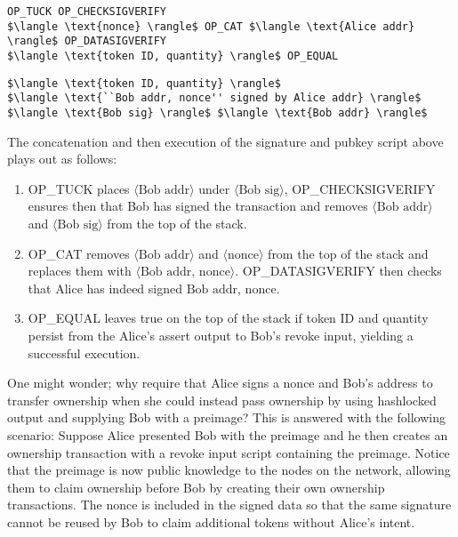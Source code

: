 \documentclass[9pt,oneside]{amsart}
\begin{document}
\begin{lstlisting}[title={\textbf{Alice's Assert PubKey Script}}]
OP_TUCK OP_CHECKSIGVERIFY
$\langle \text{nonce} \rangle$ OP_CAT $\langle \text{Alice addr} \rangle$ OP_DATASIGVERIFY
$\langle \text{token ID, quantity} \rangle$ OP_EQUAL
\end{lstlisting}

\begin{lstlisting}[title={\textbf{Bob's Revoke Signature Script}}]
$\langle \text{token ID, quantity} \rangle$ 
$\langle \text{``Bob addr, nonce'' signed by Alice addr} \rangle$ $\langle \text{Bob sig} \rangle$ $\langle \text{Bob addr} \rangle$ 
\end{lstlisting}

The concatenation and then execution of the signature and pubkey script above plays out as follows:
\begin{enumerate}
    \item OP\_TUCK places $\langle \text{Bob addr} \rangle$ under $\langle \text{Bob sig} \rangle$, OP\_CHECKSIGVERIFY ensures then that Bob has signed the transaction and removes $\langle \text{Bob addr} \rangle$ and $\langle \text{Bob sig} \rangle$ from the top of the stack.
    \item OP\_CAT removes $\langle \text{Bob addr} \rangle$ and $\langle \text{nonce} \rangle$ from the top of the stack and replaces them with $\langle \text{Bob addr, nonce} \rangle$. OP\_DATASIGVERIFY then checks that Alice has indeed signed $\text{Bob addr, nonce}$.
    \item OP\_EQUAL leaves true on the top of the stack if token ID and quantity persist from the Alice's assert output to Bob's revoke input, yielding a successful execution.
\end{enumerate}


One might wonder; why require that Alice signs a nonce and Bob's address to transfer ownership when she could instead pass ownership by using hashlocked output and supplying Bob with a preimage? This is answered with the following scenario: Suppose Alice presented Bob with the preimage and he then creates an ownership transaction with a revoke input script containing the preimage. Notice that the preimage is now public knowledge to the nodes on the network, allowing them to claim ownership before Bob by creating their own ownership transactions. The nonce is included in the signed data so that the same signature cannot be reused by Bob to claim additional tokens without Alice's intent.
\end{document}
